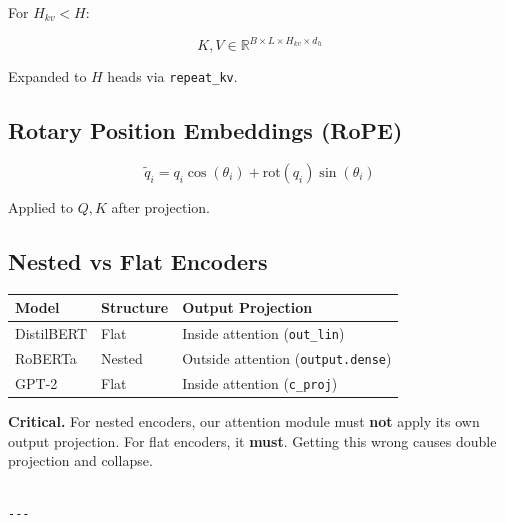 For $H_{kv} < H$:

\[
K, V \in \mathbb{R}^{B \times L \times H_{kv} \times d_h}
\]

Expanded to $H$ heads via \texttt{repeat\_kv}.

\subsection{Rotary Position Embeddings (RoPE)}

\[
\tilde{q}_i = q_i \cos(\theta_i) + \text{rot}(q_i) \sin(\theta_i)
\]

Applied to $Q, K$ after projection.

\subsection{Nested vs Flat Encoders}

\begin{table}[H]
\centering
\small
\begin{tabular}{lll}
\toprule
\textbf{Model} & \textbf{Structure} & \textbf{Output Projection} \\
\midrule
DistilBERT & Flat & Inside attention (\texttt{out\_lin}) \\
RoBERTa & Nested & Outside attention (\texttt{output.dense}) \\
GPT-2 & Flat & Inside attention (\texttt{c\_proj}) \\
\bottomrule
\end{tabular}
\end{table}

\textbf{Critical.} For nested encoders, our attention module must \textbf{not} apply 
its own output projection. For flat encoders, it \textbf{must}. Getting this 
wrong causes double projection and collapse.
\begin{lstlisting}

---
\end{lstlisting}